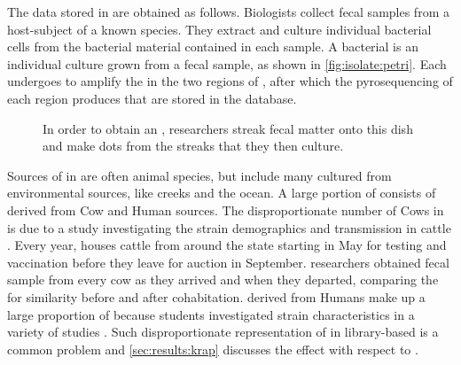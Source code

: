 The data stored in \cplop{} are obtained as follows.
Biologists collect fecal samples from a host-subject of a known species.
They extract \ecoli{} and culture individual bacterial cells from the bacterial material contained in each sample.
A bacterial \textit{\isol{}} is an individual culture grown from a fecal sample, as shown in \autoref{fig:isolate:petri}.
\index{\isol{}}
Each \isol{} undergoes \pcr{} to amplify the \dna{} in the two \itsshort{} regions of \dna{}, after which the pyrosequencing of each region produces \pyros{} that are stored in the \cplop{} database.

\begin{figure}
\centering
{}
\caption{In order to obtain an \isol{}, researchers streak fecal matter onto this dish and make dots from the streaks that they then culture.}
\label{fig:isolate:petri}
\end{figure}

Sources of \isols{} in \cplop{} are often animal species, but include many \isols{} cultured from environmental sources, like creeks and the ocean.
A large portion of \cplop{} consists of \isols{} derived from Cow and Human sources.
The disproportionate number of Cows in \cplop{} is due to a study investigating the strain demographics and transmission in cattle \cite{dillard2015demographics, dillard2013coli}.
Every year, \cp{} houses cattle from around the state starting in May for testing and vaccination before they leave for auction in September.
\cp{} researchers obtained fecal sample from every cow as they arrived and when they departed, comparing the \isols{} for similarity before and after cohabitation.
\Isols{} derived from Humans make up a large proportion of \cplop{} because \cp{} students investigated \ecoli{} strain characteristics in a variety of studies \cite{montana2012investigating, neal2012demographics, neal2013escherichia}.
Such disproportionate representation of \spec{} in library-based \mst{} is a common problem and \autoref{sec:results:krap} discusses the effect with respect to \cplop{}.


